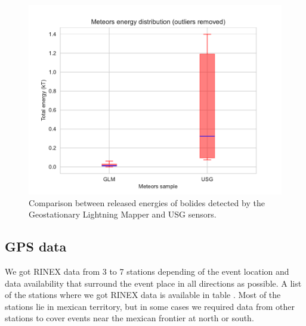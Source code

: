 \begin{figure}
  \centering
  \includegraphics[width=\linewidth]{./figures/energies_boxplot}
  \caption{Comparison between released energies of bolides detected by the Geostationary Lightning Mapper and USG sensors.}
  \label{fig:boxplot}
\end{figure}


\subsection{GPS data}
\label{ssec:GPS}

We got RINEX data from 3 to 7 stations depending of the event location and data availability that surround the event place in all directions as possible. A list of the stations where we got RINEX data is available in table%
. Most of the stations lie in mexican territory, but in some cases we required data from other stations to cover events near the mexican frontier at north or south.

